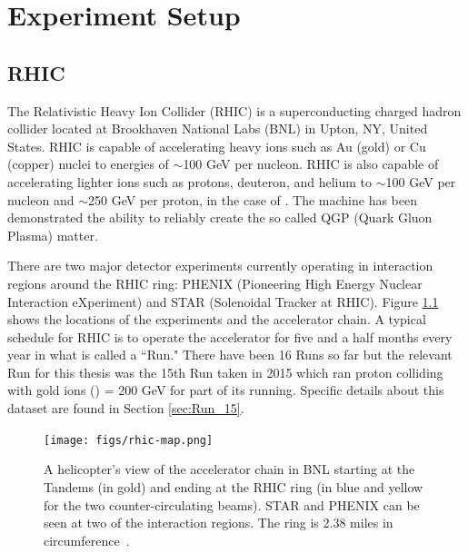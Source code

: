 \chapter{Experiment Setup}
\section{RHIC}
The Relativistic Heavy Ion Collider (RHIC) is a superconducting charged hadron collider located at Brookhaven National Labs (BNL) in Upton, NY, United States. RHIC is capable of accelerating heavy ions such as Au (gold) or Cu (copper) nuclei to energies of $\sim$100 GeV per nucleon. RHIC is also capable of accelerating lighter ions such as protons, deuteron, and helium to $\sim	$100 GeV per nucleon and $\sim$250 GeV per proton, in the case of \pp. The machine has been demonstrated the ability to reliably create the so called QGP (Quark Gluon Plasma) matter.

There are two major detector experiments currently operating in interaction regions around the RHIC ring: PHENIX (Pioneering High Energy Nuclear Interaction eXperiment) and STAR (Solenoidal Tracker at RHIC). Figure \ref{fig:rhic_heli_photo} shows the locations of the experiments and the accelerator chain. A typical schedule for RHIC is to operate the accelerator for five and a half months every year in what is called a ``Run." There have been 16 Runs so far but the relevant Run for this thesis was the 15th Run taken in 2015 which ran proton colliding with gold ions (\pau) \sqsn = 200 GeV for part of its running. Specific details about this dataset are found in Section \ref{sec:Run_15}.

\begin{figure}[!ht]
\begin{center}
\texttt{[image: figs/rhic-map.png]}
\caption{A helicopter's view of the accelerator chain in BNL starting at the Tandems (in gold) and ending at the RHIC ring (in blue and yellow for the two counter-circulating beams). STAR and PHENIX can be seen at two of the interaction regions. The ring is 2.38 miles in circumference~\cite{Tannenbaum:2013wkn}.}
\label{fig:rhic_heli_photo}
\end{center}
\end{figure}

